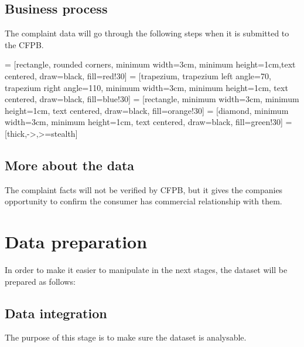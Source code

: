 \documentclass[conference]{IEEEtran}
\begin{document}
\subsection{Business process}\label{AA}
The complaint data will go through the following steps when it is submitted to the CFPB.

 = [rectangle, rounded corners, minimum width=3cm, minimum height=1cm,text centered, draw=black, fill=red!30]
 = [trapezium, trapezium left angle=70, trapezium right angle=110, minimum width=3cm, minimum height=1cm, text centered, draw=black, fill=blue!30]
 = [rectangle, minimum width=3cm, minimum height=1cm, text centered, draw=black, fill=orange!30]
 = [diamond, minimum width=3cm, minimum height=1cm, text centered, draw=black, fill=green!30]
 = [thick,->,>=stealth]


\subsection{More about the data}\label{AA}
The complaint facts will not be verified by CFPB, but it gives the companies opportunity to confirm the consumer has commercial relationship with them. 



\section{Data preparation}\label{AA}
In order to make it easier to manipulate in the next stages, the dataset will be prepared as follows:

\subsection{Data integration}\label{AA}
The purpose of this stage is to make sure the dataset is analysable.
\end{document}

